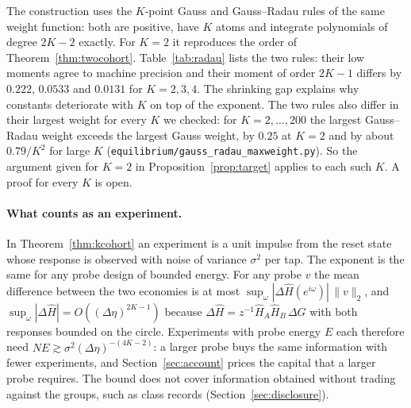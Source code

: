 The construction uses the $K$-point Gauss and Gauss--Radau rules of the same weight function: both are positive, have $K$ atoms and integrate polynomials of degree $2K-2$ exactly. For $K=2$ it reproduces the order of Theorem~\ref{thm:twocohort}. Table~\ref{tab:radau} lists the two rules: their low moments agree to machine precision and their moment of order $2K-1$ differs by $0.222$, $0.0533$ and $0.0131$ for $K=2,3,4$. The shrinking gap explains why constants deteriorate with $K$ on top of the exponent. The two rules also differ in their largest weight for every $K$ we checked: for $K=2,\ldots,200$ the largest Gauss--Radau weight exceeds the largest Gauss weight, by $0.25$ at $K=2$ and by about $0.79/K^2$ for large $K$ (\nolinkurl{equilibrium/gauss_radau_maxweight.py}). So the argument given for $K=2$ in Proposition~\ref{prop:target} applies to each such $K$. A proof for every $K$ is open.

\paragraph{What counts as an experiment.} In Theorem~\ref{thm:kcohort} an experiment is a unit impulse from the reset state whose response is observed with noise of variance $\sigma^2$ per tap. The exponent is the same for any probe design of bounded energy. For any probe $v$ the mean difference between the two economies is at most $\sup_\omega|\Delta\hat H(e^{i\omega})|\,\|v\|_2$, and $\sup_\omega|\Delta\hat H|=O((\Delta\eta)^{2K-1})$ because $\Delta\hat H=z^{-1}\hat H_A\hat H_B\,\Delta G$ with both responses bounded on the circle. Experiments with probe energy $E$ each therefore need $NE\gtrsim\sigma^2(\Delta\eta)^{-(4K-2)}$: a larger probe buys the same information with fewer experiments, and Section~\ref{sec:account} prices the capital that a larger probe requires. The bound does not cover information obtained without trading against the groups, such as class records (Section~\ref{sec:disclosure}).

